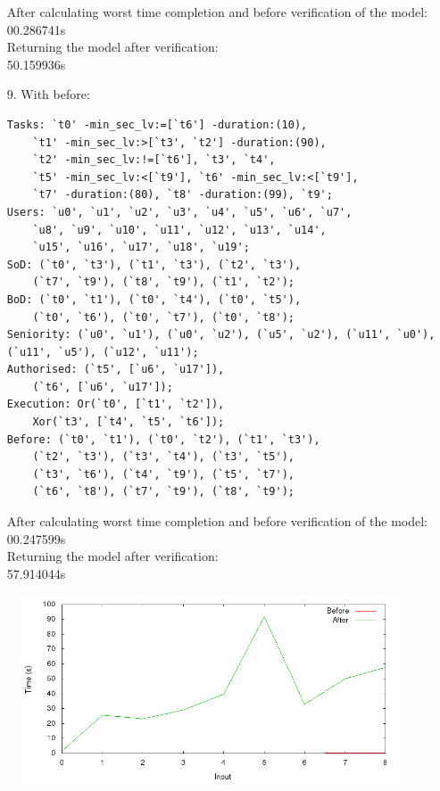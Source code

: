 \documentclass[a4paper]{report}
\begin{document}
\begin{enumerate}
After calculating worst time completion and before verification of the model:\\
00.286741s\\
Returning the model after verification: \\
50.159936s\\
\item[9.] With before:
\begin{lstlisting}[frame=single]
Tasks: `t0' -min_sec_lv:=[`t6'] -duration:(10), 
	`t1' -min_sec_lv:>[`t3', `t2'] -duration:(90), 
	`t2' -min_sec_lv:!=[`t6'], `t3', `t4', 
	`t5' -min_sec_lv:<[`t9'], `t6' -min_sec_lv:<[`t9'], 
	`t7' -duration:(80), `t8' -duration:(99), `t9';
Users: `u0', `u1', `u2', `u3', `u4', `u5', `u6', `u7', 
	`u8', `u9', `u10', `u11', `u12', `u13', `u14', 
	`u15', `u16', `u17', `u18', `u19'; 
SoD: (`t0', `t3'), (`t1', `t3'), (`t2', `t3'), 
	(`t7', `t9'), (`t8', `t9'), (`t1', `t2');
BoD: (`t0', `t1'), (`t0', `t4'), (`t0', `t5'), 
	(`t0', `t6'), (`t0', `t7'), (`t0', `t8');
Seniority: (`u0', `u1'), (`u0', `u2'), (`u5', `u2'), (`u11', `u0'), (`u11', `u5'), (`u12', `u11'); 
Authorised: (`t5', [`u6', `u17']), 
	(`t6', [`u6', `u17']);
Execution: Or(`t0', [`t1', `t2']), 
	Xor(`t3', [`t4', `t5', `t6']); 
Before: (`t0', `t1'), (`t0', `t2'), (`t1', `t3'), 
	(`t2', `t3'), (`t3', `t4'), (`t3', `t5'), 
	(`t3', `t6'), (`t4', `t9'), (`t5', `t7'), 
	(`t6', `t8'), (`t7', `t9'), (`t8', `t9');
\end{lstlisting}
After calculating worst time completion and before verification of the model:\\
00.247599s\\
Returning the model after verification: \\
57.914044s\\
\end{enumerate}

\begin{figure}[!h]
\includegraphics[scale=0.78]{benchmark.png}
\end{figure}
\end{document}
